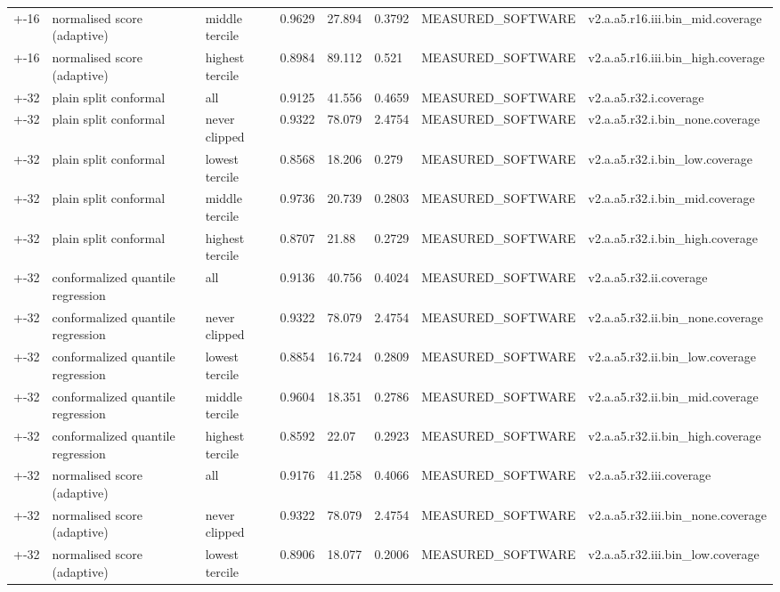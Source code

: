\begin{table}[t]
\begin{tabular}{llllllll}
+-16 & normalised score (adaptive) & middle tercile & 0.9629 & 27.894 & 0.3792 & MEASURED\_SOFTWARE & v2.a.a5.r16.iii.bin\_mid.coverage \\
+-16 & normalised score (adaptive) & highest tercile & 0.8984 & 89.112 & 0.521 & MEASURED\_SOFTWARE & v2.a.a5.r16.iii.bin\_high.coverage \\
+-32 & plain split conformal & all & 0.9125 & 41.556 & 0.4659 & MEASURED\_SOFTWARE & v2.a.a5.r32.i.coverage \\
+-32 & plain split conformal & never clipped & 0.9322 & 78.079 & 2.4754 & MEASURED\_SOFTWARE & v2.a.a5.r32.i.bin\_none.coverage \\
+-32 & plain split conformal & lowest tercile & 0.8568 & 18.206 & 0.279 & MEASURED\_SOFTWARE & v2.a.a5.r32.i.bin\_low.coverage \\
+-32 & plain split conformal & middle tercile & 0.9736 & 20.739 & 0.2803 & MEASURED\_SOFTWARE & v2.a.a5.r32.i.bin\_mid.coverage \\
+-32 & plain split conformal & highest tercile & 0.8707 & 21.88 & 0.2729 & MEASURED\_SOFTWARE & v2.a.a5.r32.i.bin\_high.coverage \\
+-32 & conformalized quantile regression & all & 0.9136 & 40.756 & 0.4024 & MEASURED\_SOFTWARE & v2.a.a5.r32.ii.coverage \\
+-32 & conformalized quantile regression & never clipped & 0.9322 & 78.079 & 2.4754 & MEASURED\_SOFTWARE & v2.a.a5.r32.ii.bin\_none.coverage \\
+-32 & conformalized quantile regression & lowest tercile & 0.8854 & 16.724 & 0.2809 & MEASURED\_SOFTWARE & v2.a.a5.r32.ii.bin\_low.coverage \\
+-32 & conformalized quantile regression & middle tercile & 0.9604 & 18.351 & 0.2786 & MEASURED\_SOFTWARE & v2.a.a5.r32.ii.bin\_mid.coverage \\
+-32 & conformalized quantile regression & highest tercile & 0.8592 & 22.07 & 0.2923 & MEASURED\_SOFTWARE & v2.a.a5.r32.ii.bin\_high.coverage \\
+-32 & normalised score (adaptive) & all & 0.9176 & 41.258 & 0.4066 & MEASURED\_SOFTWARE & v2.a.a5.r32.iii.coverage \\
+-32 & normalised score (adaptive) & never clipped & 0.9322 & 78.079 & 2.4754 & MEASURED\_SOFTWARE & v2.a.a5.r32.iii.bin\_none.coverage \\
+-32 & normalised score (adaptive) & lowest tercile & 0.8906 & 18.077 & 0.2006 & MEASURED\_SOFTWARE & v2.a.a5.r32.iii.bin\_low.coverage \\

\end{tabular}
\end{table}
